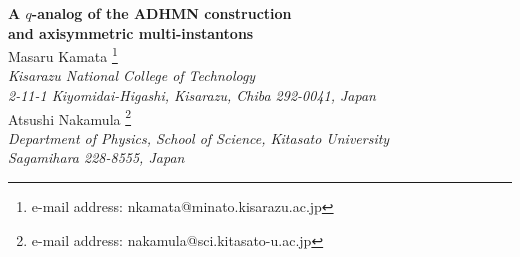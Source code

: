 \documentclass[a4paper,10pt]{article}
\newcommand{\qinv}{q^{-1}}
\newcommand{\qana}{$q$-analog }
\newcommand{\sutwo}{$SU(2)$ }
\newcommand{\sun}{$SU(n)$ }
\newcommand{\ie}{\textit{i.e.}}
\newcommand{\cf}{\textit{c.f.}}
\newcommand{\eg}{\textit{e.g.}}
\newcommand{\vs}{\vspace{1cm}}
\newcommand{\xhat}{\hat x}
\newcommand{\xth}{\frac{\partial\hat{x}}{\partial\theta}}
\newcommand{\xph}{\frac{\partial\hat{x}}{\partial\phi}}
\newcommand{\bfl}{\begin{flushleft}}
\newcommand{\efl}{\end{flushleft}}
\newcommand{\bfr}{\begin{flushright}}
\newcommand{\efr}{\end{flushright}}
\begin{document}
\thispagestyle{empty}
\begin{center}
{\Large \bf A $q$-analog of the ADHMN construction}\\ 
\vspace{5 mm}
{\Large \bf and axisymmetric multi-instantons}\\
\vspace{2cm}
Masaru Kamata 
\footnote[1]
{e-mail address: nkamata@minato.kisarazu.ac.jp} \\
  \vspace{0.7cm}
  {\it Kisarazu National College of Technology\\
    2-11-1 Kiyomidai-Higashi, Kisarazu, Chiba 292-0041, Japan}\\
  \vspace{1cm}
Atsushi Nakamula
\footnote[2]
{e-mail address: nakamula@sci.kitasato-u.ac.jp}\\
  \vspace{0.7cm}
{\it Department of Physics, School of Science, Kitasato University\\
Sagamihara 228-8555, Japan}\\
  \vspace{1.5cm}
\end{center}  
%
%
%
%
%
% 
\end{document}
